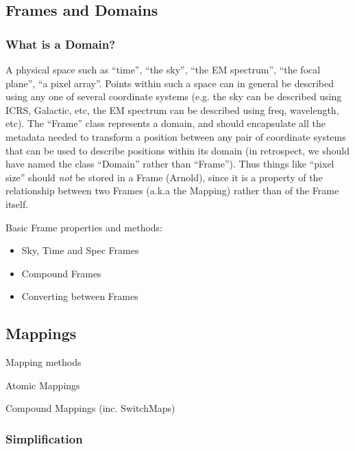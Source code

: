 \documentclass[final,authoryear,5p,times,twocolumn]{elsarticle}
\begin{document}
\subsection{Frames and Domains}

\subsubsection{What is a Domain?}

A physical space such as ``time'', ``the sky'', ``the EM spectrum'', ``the
focal plane'', ``a pixel array''. Points within such a space can in
general be described using any one of several coordinate systems
(e.g. the sky can be described using ICRS, Galactic, etc, the EM
spectrum can be described using freq, wavelength, etc). The ``Frame''
class represents a domain, and should encapsulate all the metadata
needed to transform a position between any pair of coordinate systems
that can be used to describe positions within its domain (in
retrospect, we should have named the class ``Domain'' rather than
``Frame''). Thus things like ``pixel size'' should \emph{not} be stored in a
Frame (Arnold), since it is a property of the relationship between two
Frames (a.k.a the Mapping) rather than of the Frame itself.

Basic Frame properties and methods:

\begin{itemize}
\item Sky, Time and Spec Frames
\item Compound Frames
\item Converting between Frames
\end{itemize}

\subsection{Mappings}

Mapping methods

Atomic Mappings

Compound Mappings (inc. SwitchMaps)

\subsubsection{Simplification}
\end{document}
